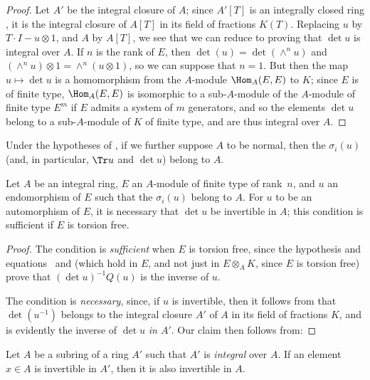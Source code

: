 \begin{proof}
Let $A'$ be the integral closure of $A$;
since $A'[T]$ is an integrally closed ring \cite[p.~99]{II-24}, it is the integral closure of $A[T]$ in its field of fractions $K(T)$.
Replacing $u$ by $T\cdot I-u\otimes1$, and $A$ by $A[T]$, we see that we can reduce to proving that $\det u$ is integral over $A$.
If $n$ is the rank of $E$, then $\det(u)=\det(\wedge^n u)$ and $(\wedge^n u)\otimes1=\wedge^n(u\otimes1)$, so we can suppose that $n=1$.
But then the map $u\mapsto\det u$ is a homomorphism from the $A$-module $\Hom_A(E,E)$ to $K$;
since $E$ is of finite type, $\Hom_A(E,E)$ is isomorphic to a sub-$A$-module of the $A$-module of finite type $E^m$ if $E$ admits a system of $m$ generators, and so the elements $\det u$ belong to a sub-$A$-module of $K$ of finite type, and are thus integral over $A$.
\end{proof}

\begin{corollary}[6.4.4]
\label{II.6.4.4}
Under the hypotheses of , if we further suppose $A$ to be normal, then the $\sigma_i(u)$ (and, in particular, $\Tr u$ and $\det u$) belong to $A$.
\end{corollary}

\begin{proposition}[6.4.5]
\label{II.6.4.5}
Let $A$ be an integral ring, $E$ an $A$-module of finite type of rank~$n$, and $u$ an endomorphism of $E$ such that the $\sigma_i(u)$ belong to $A$.
For $u$ to be an automorphism of $E$, it is necessary that $\det u$ be invertible in $A$;
this condition is sufficient if $E$ is torsion free.
\end{proposition}

\begin{proof}
The condition is \emph{sufficient} when $E$ is torsion free, since the hypothesis and equations~ and  (which hold in $E$, and not just in $E\otimes_A K$, since $E$ is torsion free) prove that $(\det u)^{-1}Q(u)$ is the inverse of $u$.

The condition is \emph{necessary}, since, if $u$ is invertible, then it follows from  that $\det(u^{-1})$ belongs to the integral closure $A'$ of $A$ in its field of fractions $K$, and is evidently the inverse of $\det u$ \emph{in $A'$}.
Our claim then follows from:
\end{proof}

\begin{lemma}[6.4.5.1]
\label{II.6.4.5.1}
Let $A$ be a subring of a ring $A'$ such that $A'$ is \emph{integral} over $A$.
If an element $x\in A$ is invertible in $A'$, then it is also invertible in $A$.
\end{lemma}

